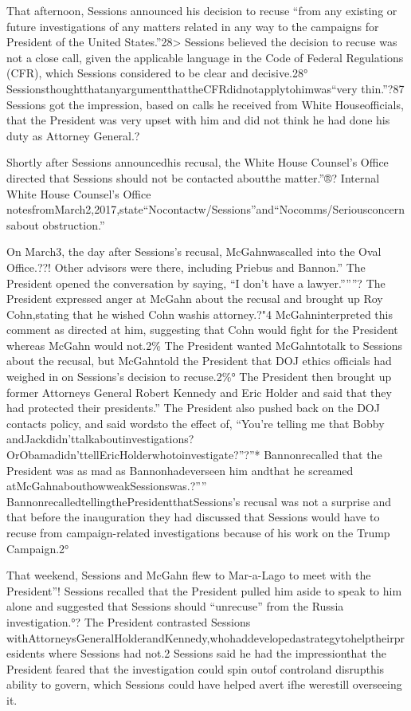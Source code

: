 That afternoon, Sessions announced his decision to recuse “from any existing or future investigations of any matters related in any way to the campaigns for President of the United States.”28> Sessions believed the decision to recuse was not a close call, given the applicable language in the Code of Federal Regulations (CFR), which Sessions considered to be clear and decisive.28° SessionsthoughtthatanyargumentthattheCFRdidnotapplytohimwas“very thin.”?87 Sessions got the impression, based on calls he received from White Houseofficials, that the President was very upset with him and did not think he had done his duty as Attorney General.?

Shortly after Sessions announcedhis recusal, the White House Counsel’s Office directed that Sessions should not be contacted aboutthe matter.”®? Internal White House Counsel’s Office notesfromMarch2,2017,state“Nocontactw/Sessions”and“Nocomms/Seriousconcernsabout obstruction.”

On March3, the day after Sessions’s recusal, McGahnwascalled into the Oval Office.??! Other advisors were there, including Priebus and Bannon.” The President opened the conversation by saying, “I don’t have a lawyer.”””? The President expressed anger at McGahn about the recusal and brought up Roy Cohn,stating that he wished Cohn washis attorney.?"4 McGahninterpreted this comment as directed at him, suggesting that Cohn would fight for the President whereas McGahn would not.2\% The President wanted McGahntotalk to Sessions about the recusal, but McGahntold the President that DOJ ethics officials had weighed in on Sessions’s decision to recuse.2\%° The President then brought up former Attorneys General Robert Kennedy and Eric Holder and said that they had protected their presidents.” The President also pushed back on the DOJ contacts policy, and said wordsto the effect of, “You’re telling me that Bobby andJackdidn’ttalkaboutinvestigations? OrObamadidn’ttellEricHolderwhotoinvestigate?”?”* Bannonrecalled that the President was as mad as Bannonhadeverseen him andthat he screamed atMcGahnabouthowweakSessionswas.?”” BannonrecalledtellingthePresidentthatSessions’s recusal was not a surprise and that before the inauguration they had discussed that Sessions would have to recuse from campaign-related investigations because of his work on the Trump Campaign.2°

That weekend, Sessions and McGahn flew to Mar-a-Lago to meet with the President”! Sessions recalled that the President pulled him aside to speak to him alone and suggested that Sessions should “unrecuse” from the Russia investigation.°? The President contrasted Sessions withAttorneysGeneralHolderandKennedy,whohaddevelopedastrategytohelptheirpresidents where Sessions had not.2 Sessions said he had the impressionthat the President feared that the investigation could spin outof controland disrupthis ability to govern, which Sessions could have helped avert ifhe werestill overseeing it.

